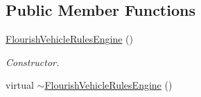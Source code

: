 \subsection*{Public Member Functions}
\begin{DoxyCompactItemize}
\item 
\hyperlink{classFlourishVehicleRulesEngine_a9f559e90fe0a9a34b94f445559d7899e}{Flourish\+Vehicle\+Rules\+Engine} ()
\begin{DoxyCompactList}\small\item\em Constructor. \end{DoxyCompactList}\item 
virtual \hyperlink{classFlourishVehicleRulesEngine_ae509135b6a35b2705a3fa05f13ab11fd}{$\sim$\+Flourish\+Vehicle\+Rules\+Engine} ()\hypertarget{classFlourishVehicleRulesEngine_ae509135b6a35b2705a3fa05f13ab11fd}{}\label{classFlourishVehicleRulesEngine_ae509135b6a35b2705a3fa05f13ab11fd}


\end{DoxyCompactItemize}
